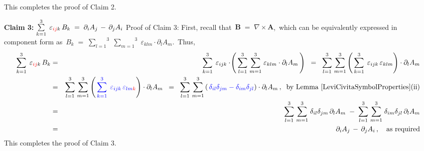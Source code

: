 This completes the proof of Claim 2.

\vskip 0.3cm
\noindent
\textbf{Claim 3:}\;\;
$
\overset{3}{\underset{k=1}{\sum}}\;\,
\varepsilon_{{\color{red}ij}k}\,B_{k}
\; = \;
    \partial_{i}A_{j}
    \, - \,
    \partial_{j}A_{i}
$
\vskip 0.1cm
\noindent
Proof of Claim 3:\;
First, recall that
\,$
\mathbf{B} \; = \; \nabla \times \mathbf{A}
$,\,
which can be equivalently expressed in component form as
\,$
B_{k}
\; = \;
    \overset{3}{\underset{l=1}{\sum}}\;
    \overset{3}{\underset{m=1}{\sum}}\;
    \varepsilon_{klm}
    \cdot
    \partial_{l}A_{m}
$.\,
Thus,
\begin{eqnarray*}
\overset{3}{\underset{k=1}{\sum}}\;\,
\varepsilon_{{\color{red}ij}k}\,B_{k}
& = &
    \overset{3}{\underset{k=1}{\sum}}\;\,
    \varepsilon_{ijk}\cdot\!\left(\,
        \overset{3}{\underset{l=1}{\sum}}\;
        \overset{3}{\underset{m=1}{\sum}}\;
        \varepsilon_{klm}
        \cdot
        \partial_{l}A_{m}
        \,\right)
\;\; = \;\;
    \overset{3}{\underset{l=1}{\sum}}\;
    \overset{3}{\underset{m=1}{\sum}}
    \left(\,
        {\color{black}
        \overset{3}{\underset{k=1}{\sum}}\;\,
        \varepsilon_{ijk}\,
        \varepsilon_{klm}
        }
        \right)
    \cdot
    \partial_{l}A_{m}
\\
& = &
    \overset{3}{\underset{l=1}{\sum}}\;
    \overset{3}{\underset{m=1}{\sum}}
    \left(\,
        {\color{blue}
        \overset{3}{\underset{k=1}{\sum}}\;\,
        \varepsilon_{ijk}\,
        \varepsilon_{lm{\color{red}k}}
        }
        \right)
    \cdot
    \partial_{l}A_{m}
\;\; = \;\;
    \overset{3}{\underset{l=1}{\sum}}\;
    \overset{3}{\underset{m=1}{\sum}}
    \left(\,
        {\color{blue}\delta_{il}\delta_{jm} - \delta_{im}\delta_{jl}}
        \right)
    \cdot
    \partial_{l}A_{m}\,,
    \;\;
    \textnormal{by Lemma \ref{LeviCivitaSymbolProperties}(ii)}
\\
& = &
    \overset{3}{\underset{l=1}{\sum}}\;
    \overset{3}{\underset{m=1}{\sum}}\;
    \delta_{il}\delta_{jm}\,\partial_{l}A_{m}
    \; - \;
    \overset{3}{\underset{l=1}{\sum}}\;
    \overset{3}{\underset{m=1}{\sum}}\;
    \delta_{im}\delta_{jl}\,\partial_{l}A_{m}
\\
& = &
    \partial_{i}A_{j}
    \, - \,
    \partial_{j}A_{i}\,,
    \quad
    \textnormal{as required}
\end{eqnarray*}
This completes the proof of Claim 3.

